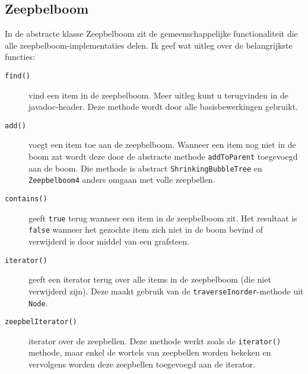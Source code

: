 \documentclass[12pt,hidelinks]{article}
\begin{document}
    \subsection{Zeepbelboom} 
    In de abstracte klasse Zeepbelboom zit de gemeenschappelijke functionaliteit die
    alle zeepbelboom-implementaties delen. Ik geef wat uitleg over de belangrijkste functies:
    \begin{description}
        \item[\tt find()] vind een item in de zeepbelboom. Meer uitleg kunt u terugvinden in de javadoc-header. Deze methode wordt door alle basisbewerkingen gebruikt.
        \item[\tt add()] voegt een item toe aan de zeepbelboom. Wanneer een item nog niet in de boom zat wordt deze door de abstracte methode {\tt addToParent} toegevoegd aan de boom.
            Die methode is abstract {\tt ShrinkingBubbleTree} en {\tt Zeepbelboom4} anders omgaan met volle zeepbellen.
        \item[\tt contains()] geeft {\tt true} terug wanneer een item in de zeepbelboom zit. Het resultaat is {\tt false} wanneer het gezochte item zich niet in de boom bevind of verwijderd is door middel van een grafsteen.
        \item[\tt iterator()] geeft een iterator terug over alle items in de zeepbelboom (die niet verwijderd zijn). Deze maakt gebruik van de {\tt traverseInorder}-methode uit {\tt Node}.
        \item[\tt zeepbelIterator()] iterator over de zeepbellen. Deze methode werkt zoals de {\tt iterator()} methode, maar enkel de wortels van zeepbellen worden bekeken
            en vervolgens worden deze zeepbellen toegevoegd aan de iterator.
    \end{description}
\end{document}

